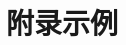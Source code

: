 
\begin{appendices}\label{sec:appendices}


	\section{附录示例}\label{sec:appendix-example}


\end{appendices}
